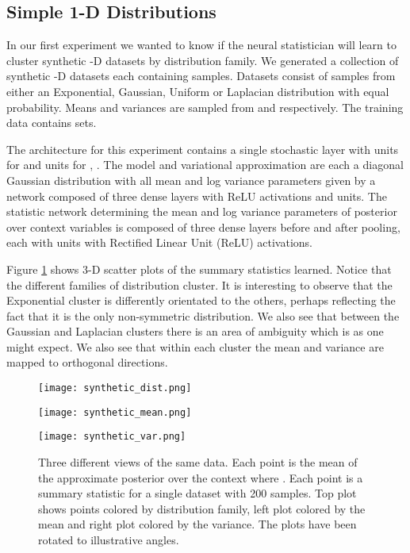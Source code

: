 \documentclass{article} \usepackage{iclr2017_conference,times}
\begin{document}
\subsection{Simple 1-D Distributions}
In our first experiment we wanted to know if the neural statistician will learn to cluster synthetic -D datasets by distribution family. We generated a collection of synthetic -D datasets each containing  samples. Datasets consist of samples from either an Exponential, Gaussian, Uniform or Laplacian distribution with equal probability. Means and variances are sampled from  and  respectively. The training data contains  sets.

 The architecture for this experiment contains a single stochastic layer with  units for  and  units for , . The model  and variational approximation  are each a diagonal Gaussian distribution with all mean and log variance parameters given by a network composed of three dense layers with ReLU activations and  units. The statistic network determining the mean and log variance parameters of posterior over context variables is composed of three dense layers before and after pooling, each with  units with Rectified Linear Unit (ReLU) activations.
 
Figure \ref{fig:synthetic_data}  shows  3-D scatter plots of the summary statistics learned. Notice that the different families of distribution cluster. It is interesting to observe that the Exponential cluster is differently orientated to the others, perhaps reflecting the fact that it is the only non-symmetric distribution. We also see that between the Gaussian and Laplacian clusters there is an area of ambiguity which is as one might expect. We also see that within each cluster the mean and variance are mapped to orthogonal directions.
\begin{figure}
\centering
\begin{minipage}{0.4\textwidth}
\hspace{-2em}
\texttt{[image: synthetic\_dist.png]}
\vspace{0.4em}
\end{minipage}

\begin{minipage}{0.4\textwidth}
\texttt{[image: synthetic\_mean.png]}
\end{minipage}
\begin{minipage}{0.4\textwidth}
\vspace{-0.9em}
\texttt{[image: synthetic\_var.png]}
\end{minipage}
\caption{Three different views of the same data. Each point is the mean of the approximate posterior over the context  where . Each point is a summary statistic for a single dataset with 200 samples. Top plot shows points colored by distribution family, left plot colored by the mean and right plot colored by the variance. The plots have been rotated to illustrative angles. \label{fig:synthetic_data}}
\end{figure}
\end{document}
